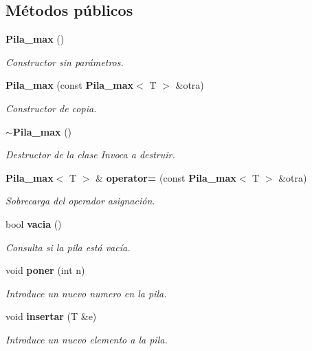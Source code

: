 \subsection*{Métodos públicos}
\begin{DoxyCompactItemize}
\item 
\label{classPila__max_a2a7e17c656ae00679fd66b2102508f4c} 
{\bf Pila\+\_\+max} ()
\begin{DoxyCompactList}\small\item\em Constructor sin parámetros. \end{DoxyCompactList}\item 
{\bf Pila\+\_\+max} (const {\bf Pila\+\_\+max}$<$ T $>$ \&otra)
\begin{DoxyCompactList}\small\item\em Constructor de copia. \end{DoxyCompactList}\item 
\label{classPila__max_a860c4516a5d558e4d493b4f051b23980} 
{\bf $\sim$\+Pila\+\_\+max} ()
\begin{DoxyCompactList}\small\item\em Destructor de la clase Invoca a destruir. \end{DoxyCompactList}\item 
{\bf Pila\+\_\+max}$<$ T $>$ \& {\bf operator=} (const {\bf Pila\+\_\+max}$<$ T $>$ \&otra)
\begin{DoxyCompactList}\small\item\em Sobrecarga del operador asignación. \end{DoxyCompactList}\item 
\label{classPila__max_a280f558007b1b064a43a9983a212f682} 
bool {\bf vacia} ()
\begin{DoxyCompactList}\small\item\em Consulta si la pila está vacía. \end{DoxyCompactList}\item 
void {\bf poner} (int n)
\begin{DoxyCompactList}\small\item\em Introduce un nuevo numero en la pila. \end{DoxyCompactList}\item 
void {\bf insertar} (T \&e)
\begin{DoxyCompactList}\small\item\em Introduce un nuevo elemento a la pila. \end{DoxyCompactList}\item 
\label{classPila__max_adb91c11d4d02c43d7d58d01be821a589} 

\end{DoxyCompactItemize}
